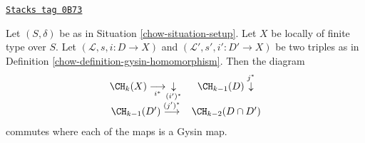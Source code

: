 \begin{lemma}
\label{chow-lemma-gysin-commutes-gysin}
\href{https://stacks.math.columbia.edu/tag/0B73}{\texttt{Stacks tag 0B73}}

Let $(S, \delta)$ be as in Situation \ref{chow-situation-setup}. Let $X$ be locally
of finite type over $S$. Let $(\mathcal{L}, s, i : D \to X)$ and
$(\mathcal{L}', s', i' : D' \to X)$ be two triples as in
Definition \ref{chow-definition-gysin-homomorphism}. Then the diagram
$$
\begin{array}{cc}\CH_k(X) \underset{i^*}{\longrightarrow}\underset{(i')^*}{\downarrow} & \CH_{k - 1}(D) \overset{j^*}{\downarrow} \\ \CH_{k - 1}(D') \overset{(j')^*}{\longrightarrow} & \CH_{k - 2}(D \cap D')\end{array}
$$
commutes where each of the maps is a Gysin map.
\end{lemma}

